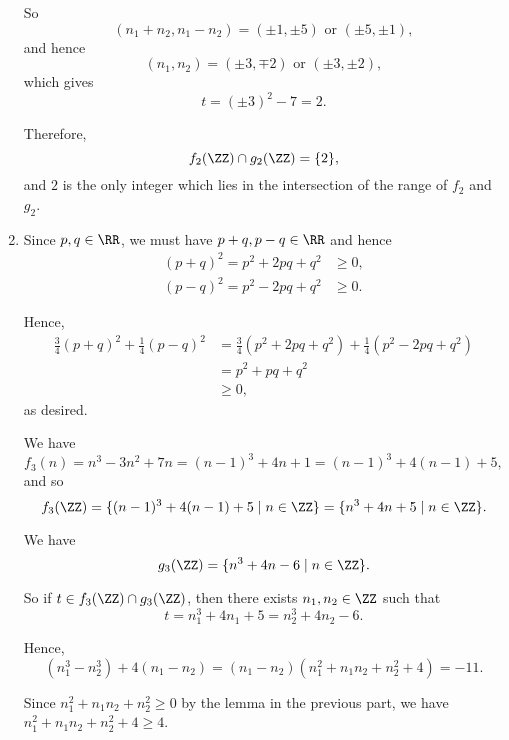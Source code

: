\begin{enumerate}
          So
          \[
              (n_1 + n_2, n_1 - n_2) = (\pm 1, \pm 5) \text{ or } (\pm 5, \pm 1),
          \]
          and hence
          \[
              (n_1, n_2) = (\pm 3, \mp 2) \text{ or } (\pm 3, \pm 2),
          \]
          which gives
          \[
              t = (\pm 3)^2 - 7 = 2.
          \]

          Therefore,
          \[
              f_2(\ZZ) \cap g_2(\ZZ) = \{2\},
          \]
          and \(2\) is the only integer which lies in the intersection of the range of \(f_2\) and \(g_2\).

    \item Since \(p, q \in \RR\), we must have \(p + q, p - q \in \RR\) and hence
          \begin{align*}
              (p + q)^2 = p^2 + 2pq + q^2 & \geq 0, \\
              (p - q)^2 = p^2 - 2pq + q^2 & \geq 0.
          \end{align*}

          Hence,
          \begin{align*}
              \frac{3}{4} (p + q)^2 + \frac{1}{4} (p - q)^2 & = \frac{3}{4} \left(p^2 + 2pq + q^2\right) + \frac{1}{4} \left(p^2 - 2pq + q^2\right) \\
                                                            & = p^2 + pq + q^2                                                                      \\
                                                            & \geq 0,
          \end{align*}
          as desired.

          We have
          \[
              f_3(n) = n^3 - 3n^2 + 7n = (n - 1)^3 + 4n + 1 = (n - 1)^3 + 4(n - 1) + 5,
          \]
          and so
          \[
              f_3(\ZZ) = \{(n - 1)^3 + 4(n - 1) + 5 \mid n \in \ZZ\} = \{n^3 + 4n + 5 \mid n \in \ZZ\}.
          \]

          We have
          \[
              g_3(\ZZ) = \{n^3 + 4n - 6 \mid n \in \ZZ\}.
          \]

          So if \(t \in f_3(\ZZ) \cap g_3(\ZZ)\), then there exists \(n_1, n_2 \in \ZZ\) such that
          \[
              t = n_1^3 + 4 n_1 + 5 = n_2^3 + 4 n_2 - 6.
          \]

          Hence,
          \[
              (n_1^3 - n_2^3) + 4(n_1 - n_2) = (n_1 - n_2) (n_1^2 + n_1 n_2 + n_2^2 + 4) = -11.
          \]

          Since \(n_1^2 + n_1 n_2 + n_2^2 \geq 0\) by the lemma in the previous part, we have \(n_1^2 + n_1 n_2 + n_2^2 + 4 \geq 4\).


\end{enumerate}
